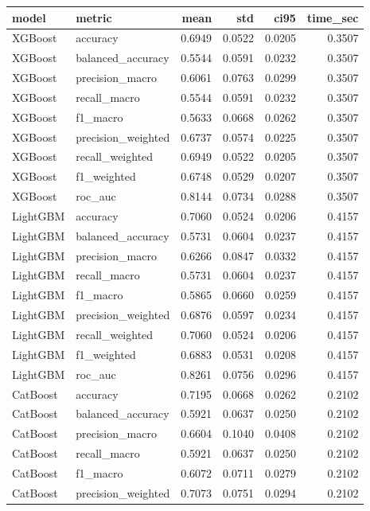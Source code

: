 \begin{tabular}{llrrrr}
\toprule
model & metric & mean & std & ci95 & time_sec \\
\midrule
XGBoost & accuracy & 0.6949 & 0.0522 & 0.0205 & 0.3507 \\
XGBoost & balanced_accuracy & 0.5544 & 0.0591 & 0.0232 & 0.3507 \\
XGBoost & precision_macro & 0.6061 & 0.0763 & 0.0299 & 0.3507 \\
XGBoost & recall_macro & 0.5544 & 0.0591 & 0.0232 & 0.3507 \\
XGBoost & f1_macro & 0.5633 & 0.0668 & 0.0262 & 0.3507 \\
XGBoost & precision_weighted & 0.6737 & 0.0574 & 0.0225 & 0.3507 \\
XGBoost & recall_weighted & 0.6949 & 0.0522 & 0.0205 & 0.3507 \\
XGBoost & f1_weighted & 0.6748 & 0.0529 & 0.0207 & 0.3507 \\
XGBoost & roc_auc & 0.8144 & 0.0734 & 0.0288 & 0.3507 \\
LightGBM & accuracy & 0.7060 & 0.0524 & 0.0206 & 0.4157 \\
LightGBM & balanced_accuracy & 0.5731 & 0.0604 & 0.0237 & 0.4157 \\
LightGBM & precision_macro & 0.6266 & 0.0847 & 0.0332 & 0.4157 \\
LightGBM & recall_macro & 0.5731 & 0.0604 & 0.0237 & 0.4157 \\
LightGBM & f1_macro & 0.5865 & 0.0660 & 0.0259 & 0.4157 \\
LightGBM & precision_weighted & 0.6876 & 0.0597 & 0.0234 & 0.4157 \\
LightGBM & recall_weighted & 0.7060 & 0.0524 & 0.0206 & 0.4157 \\
LightGBM & f1_weighted & 0.6883 & 0.0531 & 0.0208 & 0.4157 \\
LightGBM & roc_auc & 0.8261 & 0.0756 & 0.0296 & 0.4157 \\
CatBoost & accuracy & 0.7195 & 0.0668 & 0.0262 & 0.2102 \\
CatBoost & balanced_accuracy & 0.5921 & 0.0637 & 0.0250 & 0.2102 \\
CatBoost & precision_macro & 0.6604 & 0.1040 & 0.0408 & 0.2102 \\
CatBoost & recall_macro & 0.5921 & 0.0637 & 0.0250 & 0.2102 \\
CatBoost & f1_macro & 0.6072 & 0.0711 & 0.0279 & 0.2102 \\
CatBoost & precision_weighted & 0.7073 & 0.0751 & 0.0294 & 0.2102 \\

\end{tabular}
